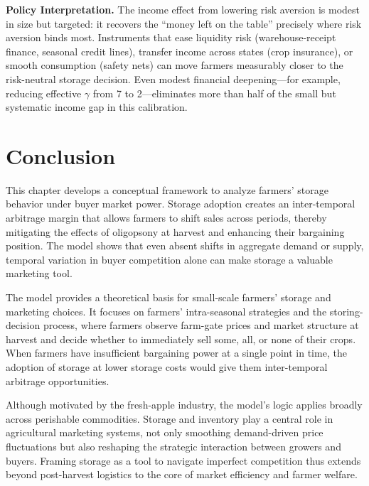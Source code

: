 \textbf{Policy Interpretation.} The income effect from lowering risk aversion is modest in size but targeted: it recovers the ``money left on the table'' precisely where risk aversion binds most. Instruments that ease liquidity risk (warehouse-receipt finance, seasonal credit lines), transfer income across states (crop insurance), or smooth consumption (safety nets) can move farmers measurably closer to the risk-neutral storage decision. Even modest financial deepening---for example, reducing effective $\gamma$ from 7 to 2---eliminates more than half of the small but systematic income gap in this calibration.










\section{Conclusion}

\noindent This chapter develops a conceptual framework to analyze farmers' storage behavior under buyer market power. Storage adoption creates an inter-temporal arbitrage margin that allows farmers to shift sales across periods, thereby mitigating the effects of oligopsony at harvest and enhancing their bargaining position. The model shows that even absent shifts in aggregate demand or supply, temporal variation in buyer competition alone can make storage a valuable marketing tool.

The model provides a theoretical basis for small-scale farmers' storage and marketing choices. It focuses on farmers' intra-seasonal strategies and the storing-decision process, where farmers observe farm-gate prices and market structure at harvest and decide whether to immediately sell some, all, or none of their crops. When farmers have insufficient bargaining power at a single point in time, the adoption of storage at lower storage costs would give them inter-temporal arbitrage opportunities.

Although motivated by the fresh-apple industry, the model's logic applies broadly across perishable commodities. Storage and inventory play a central role in agricultural marketing systems, not only smoothing demand-driven price fluctuations but also reshaping the strategic interaction between growers and buyers. Framing storage as a tool to navigate imperfect competition thus extends beyond post-harvest logistics to the core of market efficiency and farmer welfare.

